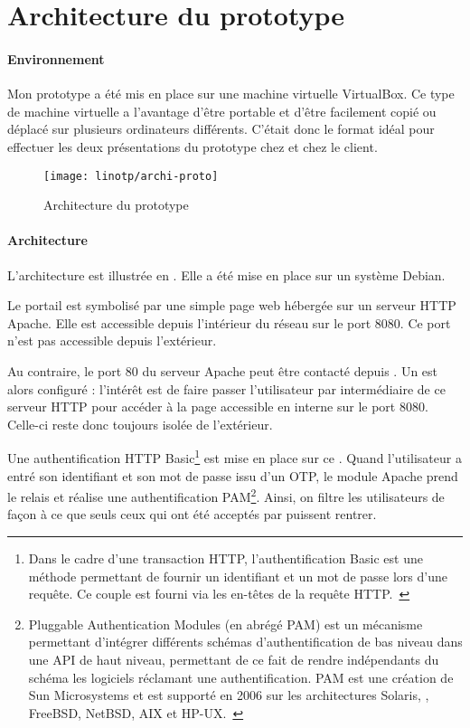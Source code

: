 \section{Architecture du prototype}
\label{section:linotp:prototype}

\paragraph{Environnement}
Mon prototype a été mis en place sur une machine virtuelle VirtualBox.
Ce type de machine virtuelle a l'avantage d'être portable et d'être facilement copié ou déplacé sur plusieurs ordinateurs différents.
C'était donc le format idéal pour effectuer les deux présentations du prototype chez \asmile{} et chez le client.

\begin{figure}
	\centering
	\texttt{[image: linotp/archi-proto]}
	\caption{Architecture du prototype \alinotp}
	\label{figure:linotp:archi-proto}
\end{figure}

\paragraph{Architecture}
L'architecture est illustrée en .
Elle a été mise en place sur un système \alinux{} Debian.

Le portail \aintranet{} \atypo{} est symbolisé par une simple page web hébergée sur un serveur HTTP Apache.
Elle est accessible depuis l'intérieur du réseau \aintranet{} sur le port 8080.
Ce port n'est pas accessible depuis l'extérieur.

Au contraire, le port 80 du serveur Apache peut être contacté depuis \ainternet.
Un \arp{} est alors configuré : l'intérêt est de faire passer l'utilisateur par intermédiaire de ce serveur HTTP pour accéder à la page accessible en interne sur le port 8080.
Celle-ci reste donc toujours isolée de l'extérieur.

Une authentification HTTP Basic\footnote{Dans le cadre d'une transaction HTTP, l'authentification Basic est une méthode permettant de fournir un identifiant et un mot de passe lors d'une requête. Ce couple est fourni via les en-têtes de la requête HTTP.~\cite{httpbasic}} est mise en place sur ce \arp{}.
Quand l'utilisateur a entré son identifiant et son mot de passe issu d'un OTP, le module Apache \amodpam{} prend le relais et réalise une authentification PAM\footnote{Pluggable Authentication Modules (en abrégé PAM) est un mécanisme permettant d'intégrer différents schémas d'authentification de bas niveau dans une API de haut niveau, permettant de ce fait de rendre indépendants du schéma les logiciels réclamant une authentification. PAM est une création de Sun Microsystems et est supporté en 2006 sur les architectures Solaris, \alinux, FreeBSD, NetBSD, AIX et HP-UX.~\cite{pam}}.
Ainsi, on filtre les utilisateurs de façon à ce que seuls ceux qui ont été acceptés par \alinotp{} puissent rentrer.

